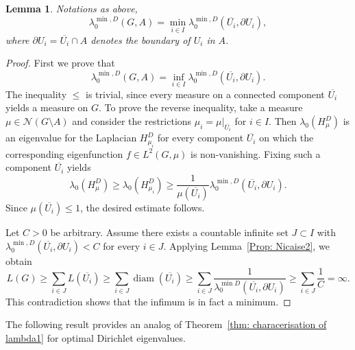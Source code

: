 \documentclass[reqno]{amsart}
\theoremstyle{plain}
\newtheorem{lem}[thm]{Lemma}
\theoremstyle{definition}
\theoremstyle{remark}
\numberwithin{equation}{section}
\newcommand{\cN}{\mathcal{N}}
\newcommand{\diam}{\operatorname{diam}}
\begin{document}
\begin{lem} \label{lem:MinimizeDirichletOverConnectedComponents}
Notations as above,
\[
\lambda_{0}^{\min, D}(G, A) = \min_{i \in I} \lambda_{0}^{\min, D}(\overline{U_i} , \partial U_i),
\]
where $\partial U_i =  \overline{U_i} \cap A$ denotes the boundary of $U_i$ in $A$.
\end{lem}
\begin{proof} First we prove that
\[
\lambda_{0}^{\min, D}(G, A) = \inf_{i \in I} \lambda_{0}^{\min, D}(\overline{U_i}, \partial U_i).
\]
The inequality \glqq$\leq$\grqq{} is trivial, since every measure on a connected component $\overline{U_i}$ yields a measure on $G$. To prove the reverse inequality, take a measure $\mu \in \cN(G \setminus A)$ and consider the restrictions $\mu_i = \mu|_{\overline{U_i}}$ for $i \in I$. Then $\lambda_0 (H_\mu^D)$ is an eigenvalue for the Laplacian $H_{\mu_i}^D$ for every component $\overline{U_i}$ on which the corresponding eigenfunction $f \in L^2(G, \mu)$ is non-vanishing. Fixing such a component $\overline{U_i}$ yields
\[
\lambda_{0}(H_{\mu}^D) \geq \lambda_{0}(H_{\mu_i}^D)  \geq \frac{1}{\mu(\overline{U_i})}\lambda_{0}^{\min, D}(\overline{U_i}, \partial U_i).
\]
Since $\mu(\overline{U_i})\leq 1$, the desired estimate follows.

Let $C> 0$ be arbitrary. Assume there exists a countable infinite set $J\subset I$ with $\lambda_{0}^{\min, D}(\overline{U_i}, \partial U_i) < C$ for every $i \in J$. Applying Lemma~\ref{Prop: Nicaise2}, we obtain
\[
L(G) \geq \sum_{i \in J} L(\overline{U_i}) \geq \sum_{i \in J} \diam(\overline{U_i}) \geq \sum_{i \in J} \frac{1}{\lambda_{0}^{\min D}(\overline{U_i}, \partial U_i)} \geq  \sum_{i \in J} \frac{1}{C} = \infty.  
\]
This contradiction shows that the infimum is in fact a minimum.  
\end{proof}

The following result provides an analog of Theorem~\ref{thm: characerisation of lambda1} for optimal Dirichlet eigenvalues.
\end{document}
